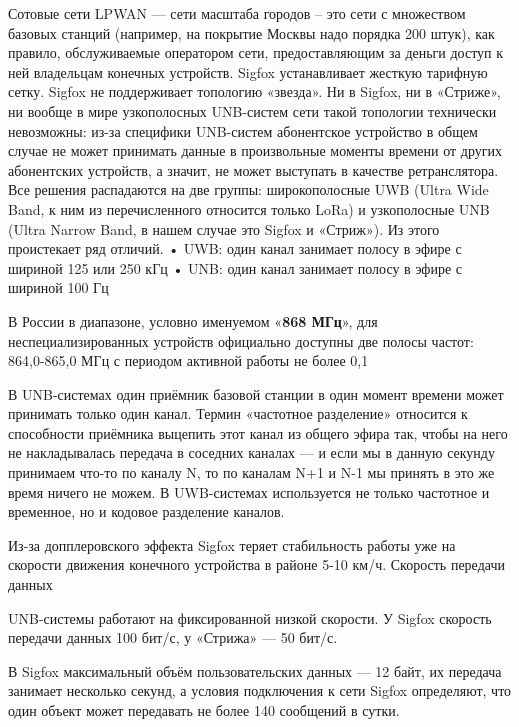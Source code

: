 Сотовые сети LPWAN — сети масштаба городов – это сети с множеством базовых станций (например, на покрытие Москвы надо порядка 200 штук), как правило, обслуживаемые оператором сети, предоставляющим за деньги доступ к ней владельцам конечных устройств. Sigfox устанавливает жесткую тарифную сетку. 
Sigfox не поддерживает топологию «звезда». Ни в Sigfox, ни в «Стриже», ни вообще в мире узкополосных UNB-систем сети такой топологии технически невозможны: из-за специфики UNB-систем абонентское устройство в общем случае не может принимать данные в произвольные моменты времени от других абонентских устройств, а значит, не может выступать в качестве ретранслятора.
Все решения распадаются на две группы: широкополосные UWB (Ultra Wide Band, к ним из перечисленного относится только LoRa) и узкополосные UNB (Ultra Narrow Band, в нашем случае это Sigfox и «Стриж»). Из этого проистекает ряд отличий.
•	UWB: один канал занимает полосу в эфире с шириной 125 или 250 кГц
•	UNB: один канал занимает полосу в эфире с шириной 100 Гц

В России в диапазоне, условно именуемом «\textbf{868 МГц}», для неспециализированных устройств официально доступны две полосы частот: 864,0-865,0 МГц с периодом активной работы не более 0,1%

В UNB-системах один приёмник базовой станции в один момент времени может принимать только один канал.  Термин «частотное разделение» относится к способности приёмника выцепить этот канал из общего эфира так, чтобы на него не накладывалась передача в соседних каналах — и если мы в данную секунду принимаем что-то по каналу N, то по каналам N+1 и N-1 мы принять в это же время ничего не можем. В UWB-системах используется не только частотное и временное, но и кодовое разделение каналов.  

Из-за допплеровского эффекта Sigfox теряет стабильность работы уже на скорости движения конечного устройства в районе 5-10 км/ч. 
Скорость передачи данных

UNB-системы работают на фиксированной низкой скорости. У Sigfox скорость передачи данных 100 бит/с, у «Стрижа» — 50 бит/с.

В Sigfox максимальный объём пользовательских данных — 12 байт, их передача занимает несколько секунд, а условия подключения к сети Sigfox определяют, что один объект может передавать не более 140 сообщений в сутки.

